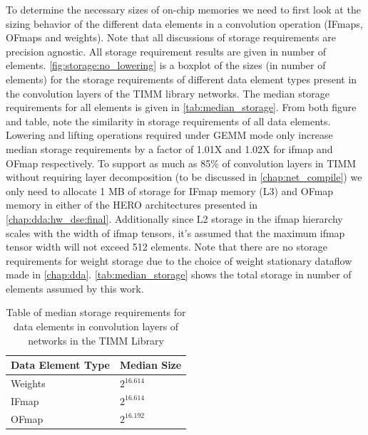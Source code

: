 To determine the necessary sizes of on-chip memories we need to first look at
the sizing behavior of the different data elements in a convolution operation
(IFmaps, OFmaps and weights). Note that all discussions of storage requirements
are precision agnostic. All storage requirement results are given in number of
elements. \autoref{fig:storage:no_lowering} is a boxplot of the sizes (in number
of elements) for the storage requirements of different data element types
present in the convolution layers of the TIMM library networks. The median
storage requirements for all elements is given in \autoref{tab:median_storage}.
From both figure and table, note the similarity in storage requirements of all
data elements. Lowering and lifting operations required under GEMM mode only
increase median storage requirements by a factor of 1.01X and 1.02X for ifmap
and OFmap respectively. To support as much as 85\% of convolution layers in TIMM
without requiring layer decomposition (to be discussed in
\autoref{chap:net_compile}) we only need to allocate 1 MB of storage for IFmap
memory (L3) and OFmap memory in either of the HERO architectures presented in
\autoref{chap:dda:hw_dse:final}. Additionally since L2 storage in the ifmap
hierarchy scales with the width of ifmap tensors, it's assumed that the maximum
ifmap tensor width will not exceed 512 elements. Note that there are no storage
requirements for weight storage due to the choice of weight stationary dataflow
made in \autoref{chap:dda}. \autoref{tab:median_storage} shows the total
storage in number of elements assumed by this work. 

\begin{table}[]
    \center
    \begin{tabular}{|l|l|}
    \hline
    Data Element Type & Median Size    \\ \hline
    Weights           & $2^{16.614}$   \\ \hline
    IFmap             & $2^{16.614}$   \\ \hline
    OFmap             & $2^{16.192}$   \\ \hline
    \end{tabular}
    \caption{Table of median storage requirements for data elements in convolution layers of networks in the TIMM Library}
    \label{tab:median_storage}
\end{table}

